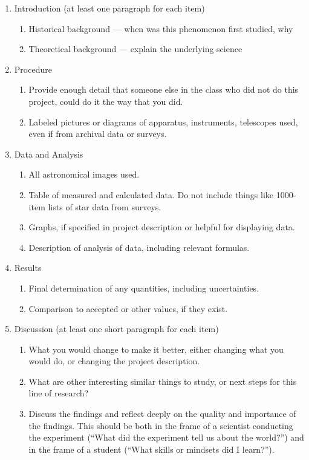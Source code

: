 \begin{enumerate}
	\item Introduction (at least one paragraph for each item)
	\begin{enumerate}
		\item Historical background --- when was this phenomenon first studied, why
		\item Theoretical background --- explain the underlying science
	\end{enumerate}

	\item Procedure
	\begin{enumerate}
		\item Provide enough detail that someone else in the class who did not do this project, could do it the way that you did.
		\item Labeled pictures or diagrams of apparatus, instruments, telescopes used, even if from archival data or surveys.
	\end{enumerate}

	\item Data and Analysis
	\begin{enumerate}
		\item All astronomical images used.
		\item Table of measured and calculated data. Do not include things like 1000-item lists of star data from surveys.
		\item Graphs, if specified in project description or helpful for displaying data.
		\item Description of analysis of data, including relevant formulas.
	\end{enumerate}

	\item Results
	\begin{enumerate}
		\item Final determination of any quantities, including uncertainties.
		\item Comparison to accepted or other values, if they exist.
	\end{enumerate}

	\item Discussion (at least one short paragraph for each item)
	\begin{enumerate}
		\item What you would change to make it better, either changing what you would do, or changing the project description.
		\item What are other interesting similar things to study, or next steps for this line of research?
		\item Discuss the findings and reflect deeply on the quality and importance of the findings. This should be both in the frame of a scientist conducting the experiment (“What did the experiment tell us about the world?”) and in the frame of a student (“What skills or mindsets did I learn?”).
	\end{enumerate}
\end{enumerate}

